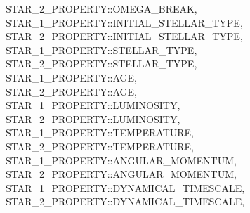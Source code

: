 \begin{minipage}{\dimexpr\textwidth-2em}
    STAR\_2\_PROPERTY::OMEGA\_BREAK, \\
    STAR\_1\_PROPERTY::INITIAL\_STELLAR\_TYPE, \\
    STAR\_2\_PROPERTY::INITIAL\_STELLAR\_TYPE, \\
    STAR\_1\_PROPERTY::STELLAR\_TYPE, \\
    STAR\_2\_PROPERTY::STELLAR\_TYPE, \\
    STAR\_1\_PROPERTY::AGE, \\
    STAR\_2\_PROPERTY::AGE, \\
    STAR\_1\_PROPERTY::LUMINOSITY, \\
    STAR\_2\_PROPERTY::LUMINOSITY, \\
    STAR\_1\_PROPERTY::TEMPERATURE, \\
    STAR\_2\_PROPERTY::TEMPERATURE, \\
    STAR\_1\_PROPERTY::ANGULAR\_MOMENTUM, \\
    STAR\_2\_PROPERTY::ANGULAR\_MOMENTUM, \\
    STAR\_1\_PROPERTY::DYNAMICAL\_TIMESCALE, \\
    STAR\_2\_PROPERTY::DYNAMICAL\_TIMESCALE,
\end{minipage}

